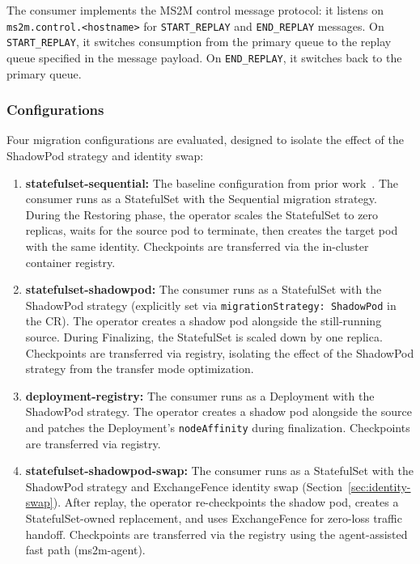 \documentclass[conference]{IEEEtran}
\begin{document}
The consumer implements the MS2M control message protocol: it listens on
\texttt{ms2m.control.<hostname>} for \texttt{START\_REPLAY} and
\texttt{END\_REPLAY} messages. On \texttt{START\_REPLAY}, it switches
consumption from the primary queue to the replay queue specified in the message
payload. On \texttt{END\_REPLAY}, it switches back to the primary queue.

\subsubsection{Configurations}

Four migration configurations are evaluated, designed to isolate the effect
of the ShadowPod strategy and identity swap:

\begin{enumerate}
\item \textbf{statefulset-sequential:} The baseline configuration from prior
  work~\cite{dinhtuan2025k8s}. The consumer runs as a StatefulSet with the
  Sequential migration strategy. During the Restoring phase, the operator
  scales the StatefulSet to zero replicas, waits for the source pod to
  terminate, then creates the target pod with the same identity. Checkpoints
  are transferred via the in-cluster container registry.

\item \textbf{statefulset-shadowpod:} The consumer runs as a StatefulSet with
  the ShadowPod strategy (explicitly set via \texttt{migrationStrategy:
  ShadowPod} in the CR). The operator creates a shadow pod alongside the
  still-running source. During Finalizing, the StatefulSet is scaled down by
  one replica. Checkpoints are transferred via registry, isolating the effect
  of the ShadowPod strategy from the transfer mode optimization.

\item \textbf{deployment-registry:} The consumer runs as a Deployment with the
  ShadowPod strategy. The operator creates a shadow pod alongside the source
  and patches the Deployment's \texttt{nodeAffinity} during finalization.
  Checkpoints are transferred via registry.

\item \textbf{statefulset-shadowpod-swap:} The consumer runs as a StatefulSet
  with the ShadowPod strategy and ExchangeFence identity swap
  (Section~\ref{sec:identity-swap}). After replay, the operator re-checkpoints
  the shadow pod, creates a StatefulSet-owned replacement, and uses
  ExchangeFence for zero-loss traffic handoff. Checkpoints are transferred via
  the registry using the agent-assisted fast path (ms2m-agent).
\end{enumerate}
\end{document}
